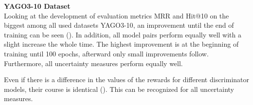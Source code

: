 \textbf{YAGO3-10 Dataset}
\label{subsubsec:metrics_yago3_10}\\
%
Looking at the development of evaluation metrics MRR and Hit@10 on the biggest among all used datasets \textsc{YAGO3-10}, an improvement until the end of training can be seen ().
In addition, all model pairs perform equally well with a slight increase the whole time.
The highest improvement is at the beginning of training until 100 epochs, afterward only  small improvements follow.
Furthermore, all uncertainty measures perform equally well.

Even if there is a difference in the values of the rewards for different discriminator models, their course is identical ().
This can be recognized for all uncertainty measures.

